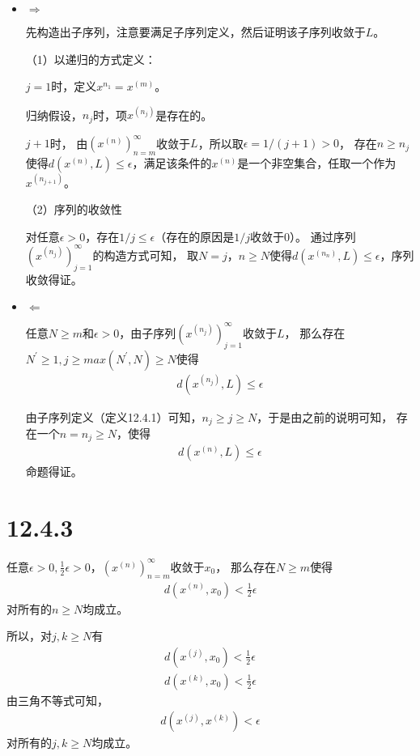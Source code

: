 \documentclass{article}
\begin{document}
\begin{itemize}
  \item $\Rightarrow$

        先构造出子序列，注意要满足子序列定义，然后证明该子序列收敛于$L$。

        （1）以递归的方式定义：

        $j=1$时，定义$x^{n_1}=x^{(m)}$。

        归纳假设，$n_j$时，项$x^{(n_j)}$是存在的。

        $j+1$时，
        由$(x^{(n)})_{n = m}^\infty$收敛于$L$，所以取$\epsilon = 1/(j+1) > 0$，
        存在$n \geq n_j$使得$d(x^{(n)}, L) \leq \epsilon$，满足该条件的$x^{(n)}$是一个非空集合，任取一个作为$x^{(n_{j+1})}$。

        （2）序列的收敛性

        对任意$\epsilon > 0$，存在$1/j \leq \epsilon$（存在的原因是$1/j$收敛于$0$）。
        通过序列$(x^{(n_j)})_{j=1}^\infty$的构造方式可知，
        取$N = j$，$n \geq N$使得$d(x^{(n_n)}, L) \leq \epsilon$，序列收敛得证。

  \item $\Leftarrow$

        任意$N \geq m$和$\epsilon > 0$，由子序列$(x^{(n_j)})_{j=1}^\infty$收敛于$L$，
        那么存在$N^\prime \geq 1, j \geq max(N^\prime, N) \geq N$使得
        \begin{align*}
          d(x^{(n_j)}, L) \leq \epsilon
        \end{align*}

        由子序列定义（定义12.4.1）可知，$n_j \geq j \geq N$，于是由之前的说明可知，
        存在一个$n = n_j \geq N$，使得
        \begin{align*}
          d(x^{(n)}, L) \leq \epsilon
        \end{align*}
        命题得证。

\end{itemize}

\section*{12.4.3}

任意$\epsilon > 0, \frac{1}{2}\epsilon > 0$，$(x^{(n)})_{n = m}^\infty$收敛于$x_0$，
那么存在$N \geq m$使得
\begin{align*}
  d(x^{(n)}, x_0) < \frac{1}{2}\epsilon
\end{align*}
对所有的$n \geq N$均成立。

所以，对$j,k \geq N$有
\begin{align*}
  d(x^{(j)}, x_0) < \frac{1}{2}\epsilon \\
  d(x^{(k)}, x_0) < \frac{1}{2}\epsilon
\end{align*}
由三角不等式可知，
\begin{align*}
  d(x^{(j)}, x^{(k)}) < \epsilon
\end{align*}
对所有的$j,k \geq N$均成立。
\end{document}
